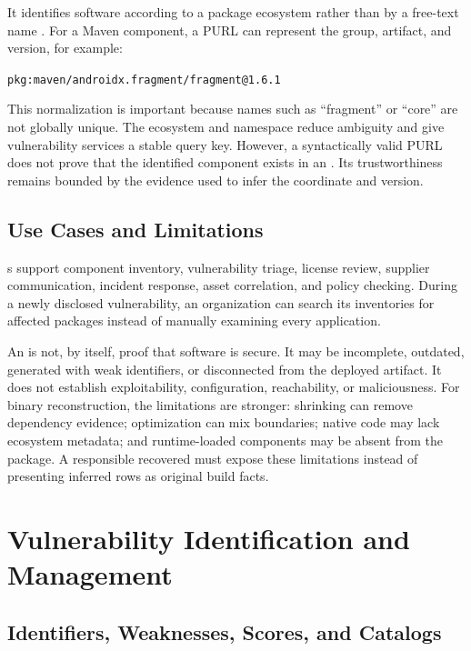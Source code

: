 It identifies software according to a package ecosystem rather than by a
free-text name \cite{packageUrlSpecification}. For a Maven component, a PURL
can represent the group, artifact, and version, for example:

\begin{center}
\texttt{pkg:maven/androidx.fragment/fragment@1.6.1}
\end{center}

This normalization is important because names such as ``fragment'' or
``core'' are not globally unique. The ecosystem and namespace reduce
ambiguity and give vulnerability services a stable query key. However, a
syntactically valid PURL does not prove that the identified component exists
in an \APK. Its trustworthiness remains bounded by the evidence used to infer
the coordinate and version.

\subsection{Use Cases and Limitations}

\SBOM{}s support component inventory, vulnerability triage, license review,
supplier communication, incident response, asset correlation, and policy
checking. During a newly disclosed vulnerability, an organization can search
its inventories for affected packages instead of manually examining every
application.

An \SBOM is not, by itself, proof that software is secure. It may be incomplete,
outdated, generated with weak identifiers, or disconnected from the deployed
artifact. It does not establish exploitability, configuration, reachability,
or maliciousness. For binary reconstruction, the limitations are stronger:
shrinking can remove dependency evidence; optimization can mix boundaries;
native code may lack ecosystem metadata; and runtime-loaded components may be
absent from the package. A responsible recovered \SBOM must expose these
limitations instead of presenting inferred rows as original build facts.

\section{Vulnerability Identification and Management}

\subsection{Identifiers, Weaknesses, Scores, and Catalogs}

